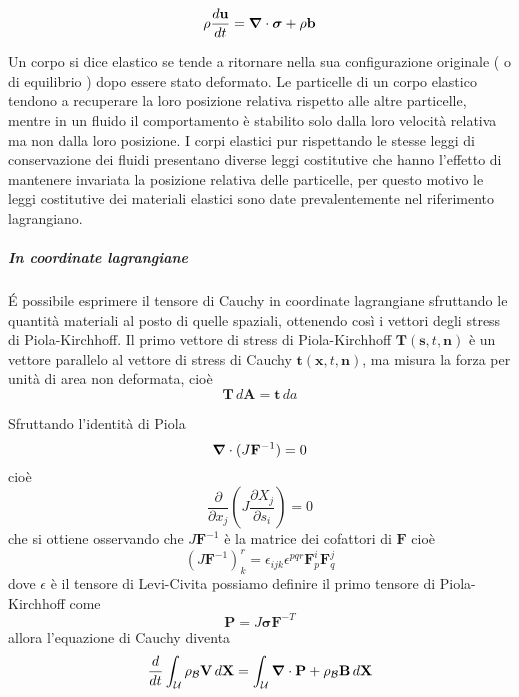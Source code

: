 \begin{equation*}
\rho\frac{d\mathbf{u}}{dt} = \boldsymbol{\nabla}\cdot \boldsymbol{\sigma} + \rho\mathbf{b}
\end{equation*}

%
Un corpo si dice elastico se tende a ritornare nella sua configurazione originale ( o di equilibrio ) dopo essere stato deformato. Le particelle di un corpo elastico tendono a recuperare la loro posizione relativa rispetto alle altre particelle, mentre in un fluido il comportamento è stabilito solo dalla loro velocità relativa ma non dalla loro posizione. I corpi elastici pur rispettando le stesse leggi di conservazione dei fluidi presentano diverse leggi costitutive che hanno l'effetto di mantenere invariata la posizione relativa delle particelle, per questo motivo le leggi costitutive dei materiali elastici sono date prevalentemente nel riferimento lagrangiano.
%

\subparagraph{In coordinate lagrangiane}
\'E possibile esprimere il tensore di Cauchy in coordinate lagrangiane sfruttando le quantità materiali al posto di quelle spaziali, ottenendo così i vettori degli stress di Piola-Kirchhoff.
Il primo vettore di stress di Piola-Kirchhoff $\mathbf{T}(\mathbf{s},t,\mathbf{n})$ è un vettore parallelo al vettore di stress di Cauchy $\mathbf{t}(\mathbf{x},t,\mathbf{n})$, ma misura la forza per unità di area non deformata,
cioè
\begin{equation*}\mathbf{T}\,d\mathbf{A} = \mathbf{t}\,da
\end{equation*}

Sfruttando l'identità di Piola
\begin{equation*}
\boldsymbol{\nabla} \cdot (J\mathbf{F}^{-1}) = 0
\end{equation*}
cioè
\begin{equation*}
\frac{\partial}{\partial x_j}(J\frac{\partial X_j}{\partial s_i}) = 0
\end{equation*}
che si ottiene osservando che $J\mathbf{F}^{-1}$ è la matrice dei cofattori di $\mathbf{F}$ cioè
\begin{equation*}
(J\mathbf{F}^{-1})^r_k = \epsilon_{ijk}\epsilon^{pqr}\mathbf{F}^i_p\mathbf{F}^j_q
\end{equation*}
dove $\epsilon$ è il tensore di Levi-Civita possiamo definire il primo tensore di Piola-Kirchhoff come 
\begin{equation*}
\mathbf{P}=J\boldsymbol{\sigma}\mathbf{F}^{-T}
\end{equation*}
allora l'equazione di Cauchy diventa
\begin{equation*}
\frac{d}{dt}\int_{\mathcal{U}}\rho_{\mathcal{B}}\mathbf{V}\, d\mathbf{X} = \int_\mathcal{U}\boldsymbol{\nabla}\cdot\mathbf{P}+\rho_{\mathcal{B}}\mathbf{B}\, d\mathbf{X}
\end{equation*}

